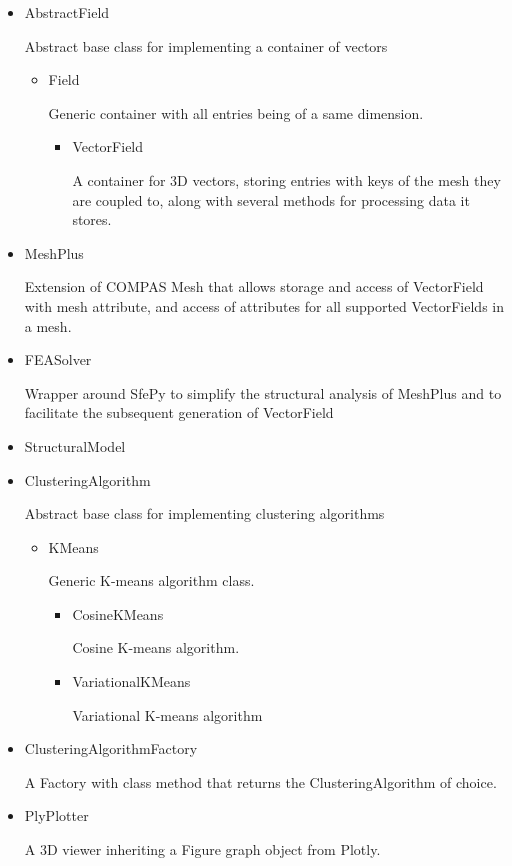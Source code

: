 \documentclass[11pt]{article}
\begin{document}
\begin{itemize}
    \item AbstractField
    
    Abstract base class for implementing a container of vectors
    
    \begin{itemize}
        \item Field
        
        Generic container with all entries being of a same dimension.
        
        \begin{itemize}
            \item VectorField
            
            A container for 3D vectors, storing entries with keys of the mesh they are coupled to, along with several methods for processing data it stores.
        
        \end{itemize}
    \end{itemize}
    
    \item MeshPlus
    
    Extension of COMPAS Mesh that allows storage and access of VectorField with mesh attribute, and access of attributes for all supported VectorFields in a mesh.
    
    \item FEASolver
    
    Wrapper around SfePy to simplify the structural analysis of MeshPlus and to facilitate the subsequent generation of VectorField 
    
    \item StructuralModel
    \item ClusteringAlgorithm
    
    Abstract base class for implementing clustering algorithms
    
    \begin{itemize}
        \item KMeans
        
        Generic K-means algorithm class.
        
        \begin{itemize}
            \item CosineKMeans
            
            Cosine K-means algorithm.
            
            \item VariationalKMeans
            
            Variational K-means algorithm
        
        \end{itemize}
    \end{itemize}
    \item ClusteringAlgorithmFactory
    
    A Factory with class method  that returns  the  ClusteringAlgorithm of choice.  
      
    \item PlyPlotter
    
    A 3D viewer inheriting a Figure graph object from Plotly.
\end{itemize}
\end{document}
